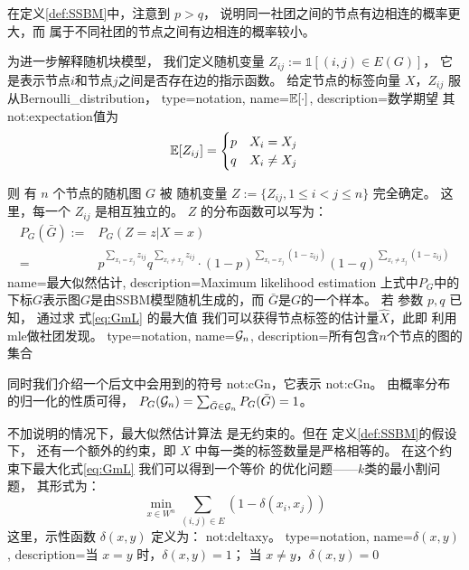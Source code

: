 在定义\ref{def:SSBM}中，注意到 $p>q$，
说明同一社团之间的节点有边相连的概率更大，而
属于不同社团的节点之间有边相连的概率较小。

为进一步解释随机块模型，
我们定义随机变量 $Z_{ij}:=\mathds{1} [(i,j) \in E(G)]$，
它是表示节点$i$和节点$j$之间是否存在边的指示函数。
给定节点的标签向量 $X$，$Z_{ij}$ 服从\gls{Bernoulli_distribution}，
{
  type=notation,
  name={$\operatorname{\mathbb{E}}[\cdot]$},
  description={数学期望}
}
其\glsdesc{not:expectation}值为
\begin{equation}
\operatorname{\mathbb{E}}[Z_{ij}] =
\begin{cases}
p & X_i = X_j \\ 
q & X_i \neq X_j
\end{cases}
\end{equation}

则 有 $n$ 个节点的随机图 $G$ 
被 
随机变量 $Z:=\{Z_{ij}, 1\leq i<j\leq n\}$ 完全确定。
这里，每一个 $Z_{ij}$ 是相互独立的。
$Z$ 的分布函数可以写为：
\begin{align}\label{eq:mle_sibm}
P_G(\bar{G}):=&P_G(Z = z| X=x) \\
=& p^{\sum_{x_i = x_j}
z_{ij}}q^{\sum_{x_i \neq x_j} z_{ij}} 
\cdot (1-p)^{\sum_{x_i = x_j} (1-z_{ij})}
(1-q)^{\sum_{x_i \neq x_j} (1-z_{ij})}
\label{eq:GmL}
\end{align}
{name=最大似然估计,
description={Maximum likelihood estimation}}
上式中$P_G$中的下标$G$表示图$G$是由SSBM模型随机生成的，而
$\bar{G}$是$G$的一个样本。
若 参数 $p, q$ 已知，
通过求
式\eqref{eq:GmL} 的最大值
我们可以获得节点标签的估计量$\hat{X}$，此即
利用\gls{mle}做社团发现。
{
  type=notation,
  name={$\mathcal{G}_n$},
  description={所有包含$n$个节点的图的集合}
}

同时我们介绍一个后文中会用到的符号 \gls{not:cGn}，它表示
\glsdesc{not:cGn}。
由概率分布的归一化的性质可得，
$P_G(\mathcal{G}_n) = \sum_{\bar{G}\in \mathcal{G}_n}P_G(\bar{G})=1$。

不加说明的情况下，最大似然估计算法 是无约束的。但在
定义\ref{def:SSBM}的假设下，
还有一个额外的约束，即 $X$ 中每一类的标签数量是严格相等的。
在这个约束下最大化式\eqref{eq:GmL} 我们可以得到一个等价
的优化问题——$k$类的最小割问题，
其形式为：
\begin{equation}\label{eq:minimum_k_cut}
  \min_{x\in W^n} \sum_{ (i,j) \in E} (1-\delta(x_i, x_j))
\end{equation}
这里，示性函数 $\delta(x,y)$ 定义为：
\glsdesc{not:deltaxy}。
{
  type=notation,
  name={$\delta(x,y)$},
  description={当 $x=y$ 时，$\delta(x,y) = 1$； 当 $x\neq y$，$\delta(x,y)=0$}
}

